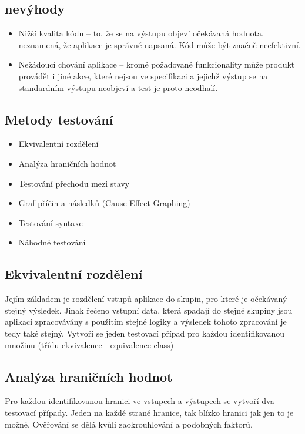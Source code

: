 \documentclass{article}
\begin{document}
\begin{large}
\subsection{nevýhody}
\begin{itemize}
    \item Nižší kvalita kódu – to, že se na výstupu objeví očekávaná hodnota, neznamená, že aplikace je správně napsaná. Kód může být značně neefektivní.
    \item Nežádoucí chování aplikace – kromě požadované funkcionality může produkt provádět i jiné akce, které nejsou ve specifikaci a jejichž výstup se na standardním výstupu neobjeví a test je proto neodhalí.
\end{itemize}
\subsection{Metody testování}
\begin{itemize}
    \item Ekvivalentní rozdělení
    \item Analýza hraničních hodnot
    \item Testování přechodu mezi stavy
    \item Graf příčin a následků (Cause-Effect Graphing)
    \item Testování syntaxe
    \item Náhodné testování
\end{itemize}
\subsection{Ekvivalentní rozdělení}
Jejím základem je rozdělení vstupů aplikace do skupin, pro které je očekávaný stejný výsledek. Jinak řečeno vstupní data, která spadají do stejné skupiny jsou aplikací zpracovávány s použitím stejné logiky a výsledek tohoto zpracování je tedy také stejný.
\newline
Vytvoří se jeden testovací případ pro každou identifikovanou množinu (třídu ekvivalence - equivalence class)
\subsection{Analýza hraničních hodnot}
Pro každou identifikovanou hranici ve vstupech a výstupech se vytvoří dva testovací případy. Jeden na každé straně hranice, tak blízko hranici jak jen to je možné. Ověřování se dělá kvůli zaokrouhlování a podobných faktorů.

\end{large}
\end{document}
